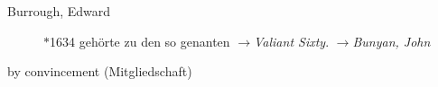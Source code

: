 \begin{description}
 \item[Burrough, Edward] $\ast$1634  gehörte zu den so genanten $\to$\textit{Valiant Sixty}. $\to$\textit{Bunyan, John}
 \item[by convincement (Mitgliedschaft)]
 \end{description}

\normalsize

